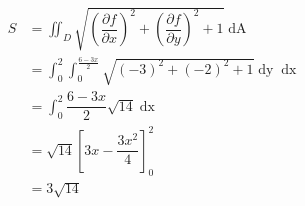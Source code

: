 \begin{align*}
	S &= \iint_D \sqrt{\left(\dfrac{\partial f}{\partial x}\right)^2 + \left(\dfrac{\partial f}{\partial y}\right)^2 + 1} \mathop{dA}\\
	&= \int_0^2 \int_0^\frac{6-3x}{2} \sqrt{\left(-3\right)^2 + \left(-2\right)^2 + 1} \mathop{dy} \mathop{dx}\\
	&= \int_0^2 \dfrac{6-3x}{2} \sqrt{14} \mathop{dx}\\
	&= \sqrt{14}\left[ 3x-\dfrac{3x^2}{4}\right]^2_0\\
	&= 3\sqrt{14}
\end{align*}


